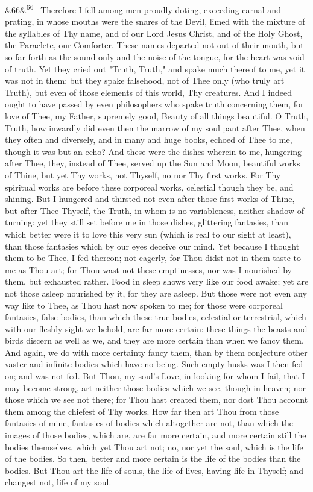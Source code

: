 \documentclass[12pt]{article}
\newcommand{\para}[1][]{\par\noindent\ifx&#1&\else\textsuperscript{\footnotesize #1}~\fi}
\begin{document}
\para[66] Therefore I fell among men proudly doting, exceeding carnal and prating, in whose mouths were the snares of the Devil, limed with the mixture of the syllables of Thy name, and of our Lord Jesus Christ, and of the Holy Ghost, the Paraclete, our Comforter. These names departed not out of their mouth, but so far forth as the sound only and the noise of the tongue, for the heart was void of truth. Yet they cried out "Truth, Truth," and spake much thereof to me, yet it was not in them: but they spake falsehood, not of Thee only (who truly art Truth), but even of those elements of this world, Thy creatures. And I indeed ought to have passed by even philosophers who spake truth concerning them, for love of Thee, my Father, supremely good, Beauty of all things beautiful. O Truth, Truth, how inwardly did even then the marrow of my soul pant after Thee, when they often and diversely, and in many and huge books, echoed of Thee to me, though it was but an echo? And these were the dishes wherein to me, hungering after Thee, they, instead of Thee, served up the Sun and Moon, beautiful works of Thine, but yet Thy works, not Thyself, no nor Thy first works. For Thy spiritual works are before these corporeal works, celestial though they be, and shining. But I hungered and thirsted not even after those first works of Thine, but after Thee Thyself, the Truth, in whom is no variableness, neither shadow of turning: yet they still set before me in those dishes, glittering fantasies, than which better were it to love this very sun (which is real to our sight at least), than those fantasies which by our eyes deceive our mind. Yet because I thought them to be Thee, I fed thereon; not eagerly, for Thou didst not in them taste to me as Thou art; for Thou wast not these emptinesses, nor was I nourished by them, but exhausted rather. Food in sleep shows very like our food awake; yet are not those asleep nourished by it, for they are asleep. But those were not even any way like to Thee, as Thou hast now spoken to me; for those were corporeal fantasies, false bodies, than which these true bodies, celestial or terrestrial, which with our fleshly sight we behold, are far more certain: these things the beasts and birds discern as well as we, and they are more certain than when we fancy them. And again, we do with more certainty fancy them, than by them conjecture other vaster and infinite bodies which have no being. Such empty husks was I then fed on; and was not fed. But Thou, my soul's Love, in looking for whom I fail, that I may become strong, art neither those bodies which we see, though in heaven; nor those which we see not there; for Thou hast created them, nor dost Thou account them among the chiefest of Thy works. How far then art Thou from those fantasies of mine, fantasies of bodies which altogether are not, than which the images of those bodies, which are, are far more certain, and more certain still the bodies themselves, which yet Thou art not; no, nor yet the soul, which is the life of the bodies. So then, better and more certain is the life of the bodies than the bodies. But Thou art the life of souls, the life of lives, having life in Thyself; and changest not, life of my soul.
\end{document}
